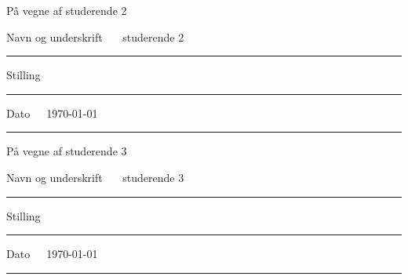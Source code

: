 \documentclass[11pt, a4paper]{article}
\newcommand{\studerendeTO}{ studerende 2 }	 		%
\newcommand{\studerendeTRE}{ studerende 3 }	 		%
\begin{document}
\vspace{5mm}
På vegne af \studerendeTO

Navn og underskrift~~~\studerendeTO
\vspace{1mm}
\hrule
\vspace{5mm}
Stilling~~~
\vspace{1mm}
\hrule
\vspace{5mm}
Dato~~~\today
\vspace{1mm}
\hrule


\vspace{5mm}
På vegne af \studerendeTRE

Navn og underskrift~~~\studerendeTRE
\vspace{1mm}
\hrule
\vspace{5mm}
Stilling~~~
\vspace{1mm}
\hrule
\vspace{5mm}
Dato~~~\today
\vspace{1mm}
\hrule
\end{document}
